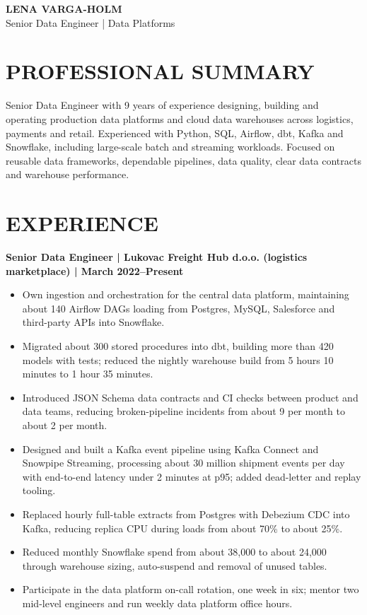 \documentclass[11pt,a4paper]{article}
\begin{document}
\begin{center}
{\Huge\bfseries\color{primarycolor} LENA VARGA-HOLM}\\[0.25em]
{\large\color{accentcolor} Senior Data Engineer | Data Platforms}
\end{center}

\section*{PROFESSIONAL SUMMARY}
Senior Data Engineer with 9 years of experience designing, building and operating production data platforms and cloud data warehouses across logistics, payments and retail. Experienced with Python, SQL, Airflow, dbt, Kafka and Snowflake, including large-scale batch and streaming workloads. Focused on reusable data frameworks, dependable pipelines, data quality, clear data contracts and warehouse performance.

\section*{EXPERIENCE}

\noindent\textbf{Senior Data Engineer | Lukovac Freight Hub d.o.o. (logistics marketplace) | March 2022--Present}
\begin{itemize}
\item Own ingestion and orchestration for the central data platform, maintaining about 140 Airflow DAGs loading from Postgres, MySQL, Salesforce and third-party APIs into Snowflake.
\item Migrated about 300 stored procedures into dbt, building more than 420 models with tests; reduced the nightly warehouse build from 5 hours 10 minutes to 1 hour 35 minutes.
\item Introduced JSON Schema data contracts and CI checks between product and data teams, reducing broken-pipeline incidents from about 9 per month to about 2 per month.
\item Designed and built a Kafka event pipeline using Kafka Connect and Snowpipe Streaming, processing about 30 million shipment events per day with end-to-end latency under 2 minutes at p95; added dead-letter and replay tooling.
\item Replaced hourly full-table extracts from Postgres with Debezium CDC into Kafka, reducing replica CPU during loads from about 70\% to about 25\%.
\item Reduced monthly Snowflake spend from about 38,000 to about 24,000 through warehouse sizing, auto-suspend and removal of unused tables.
\item Participate in the data platform on-call rotation, one week in six; mentor two mid-level engineers and run weekly data platform office hours.
\end{itemize}
\end{document}
